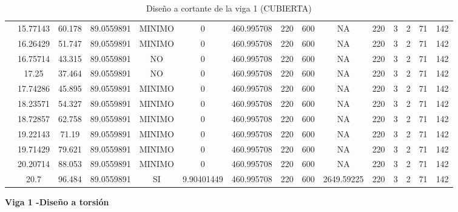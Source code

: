 \begin{table}[H]
{\begin{tabular}{|c|c|c|c|c|c|c|c|c|c|c|c|c|c|c|}
\cline{2-15}    & 15.77143 & 60.178 & 89.0559891 & MINIMO & 0   & 460.995708 & 220 & 600 & NA  & 220 & 3   & 2   & 71  & 142 \bigstrut\\
\cline{2-15}    & 16.26429 & 51.747 & 89.0559891 & MINIMO & 0   & 460.995708 & 220 & 600 & NA  & 220 & 3   & 2   & 71  & 142 \bigstrut\\
\cline{2-15}    & 16.75714 & 43.315 & 89.0559891 & NO  & 0   & 460.995708 & 220 & 600 & NA  & 220 & 3   & 2   & 71  & 142 \bigstrut\\
\cline{2-15}    & 17.25 & 37.464 & 89.0559891 & NO  & 0   & 460.995708 & 220 & 600 & NA  & 220 & 3   & 2   & 71  & 142 \bigstrut\\
\cline{2-15}    & 17.74286 & 45.895 & 89.0559891 & MINIMO & 0   & 460.995708 & 220 & 600 & NA  & 220 & 3   & 2   & 71  & 142 \bigstrut\\
\cline{2-15}    & 18.23571 & 54.327 & 89.0559891 & MINIMO & 0   & 460.995708 & 220 & 600 & NA  & 220 & 3   & 2   & 71  & 142 \bigstrut\\
\cline{2-15}    & 18.72857 & 62.758 & 89.0559891 & MINIMO & 0   & 460.995708 & 220 & 600 & NA  & 220 & 3   & 2   & 71  & 142 \bigstrut\\
\cline{2-15}    & 19.22143 & 71.19 & 89.0559891 & MINIMO & 0   & 460.995708 & 220 & 600 & NA  & 220 & 3   & 2   & 71  & 142 \bigstrut\\
\cline{2-15}    & 19.71429 & 79.621 & 89.0559891 & MINIMO & 0   & 460.995708 & 220 & 600 & NA  & 220 & 3   & 2   & 71  & 142 \bigstrut\\
\cline{2-15}    & 20.20714 & 88.053 & 89.0559891 & MINIMO & 0   & 460.995708 & 220 & 600 & NA  & 220 & 3   & 2   & 71  & 142 \bigstrut\\
\cline{2-15}    & 20.7 & 96.484 & 89.0559891 & SI  & 9.90401449 & 460.995708 & 220 & 600 & 2649.59225 & 220 & 3   & 2   & 71  & 142 \bigstrut\\
\hline
\end{tabular}%



  
 
  }%
    \caption{Diseño a cortante de la viga 1 (CUBIERTA) }
  \label{tab:C VG1 CUB }%
\end{table}%
\newpage
\textbf{Viga 1 -Diseño a torsión}
